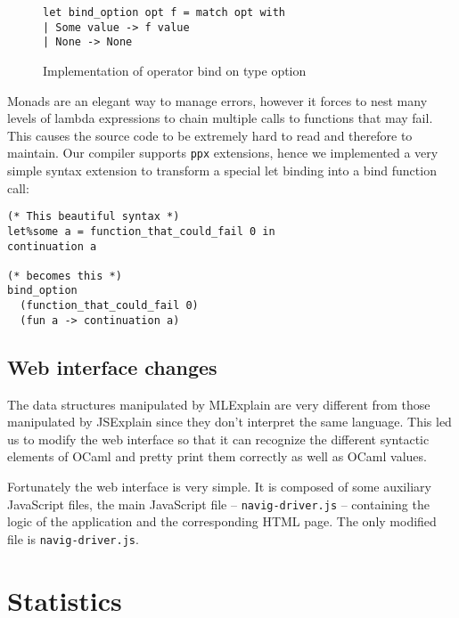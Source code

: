 \documentclass[twocolumn]{article}
\begin{document}
\begin{figure}[hb]
  \begin{verbatim}
let bind_option opt f = match opt with
| Some value -> f value
| None -> None
  \end{verbatim}
  
  \label{fig:error}
  \caption{Implementation of operator bind on type option}
\end{figure}

Monads are an elegant way to manage errors, however it forces to nest many
levels of lambda expressions to chain multiple calls to functions that may
fail. This causes the source code to be extremely hard to read and therefore to
maintain. Our compiler supports \texttt{ppx} extensions, hence we implemented a
very simple syntax extension to transform a special let binding into a bind
function call:

\begin{verbatim}
(* This beautiful syntax *)
let%some a = function_that_could_fail 0 in
continuation a

(* becomes this *)
bind_option
  (function_that_could_fail 0)
  (fun a -> continuation a)
\end{verbatim}

\subsection{Web interface changes}

The data structures manipulated by MLExplain are very different from those
manipulated by JSExplain since they don't interpret the same language. This led
us to modify the web interface so that it can recognize the different syntactic
elements of OCaml and pretty print them correctly as well as OCaml values.

Fortunately the web interface is very simple. It is composed of some auxiliary
JavaScript files, the main JavaScript file -- \texttt{navig-driver.js} --
containing the logic of the application and the corresponding HTML page. The
only modified file is \texttt{navig-driver.js}.

\section{Statistics}
\end{document}
